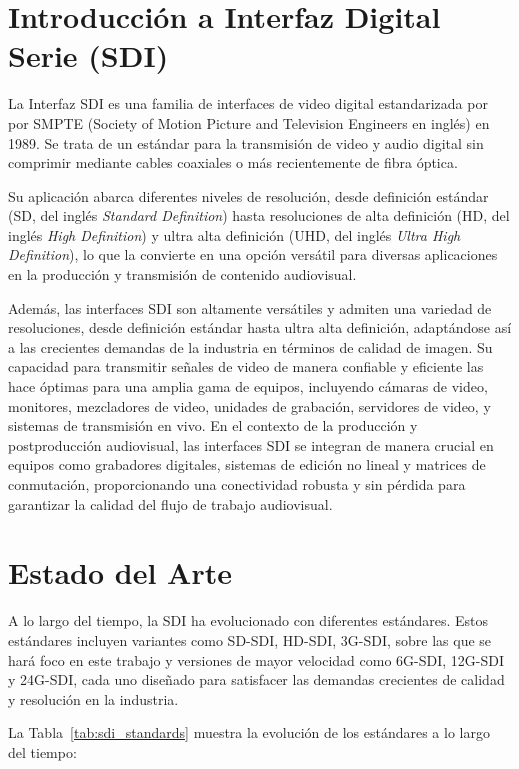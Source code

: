 \section{Introducción a Interfaz Digital Serie (SDI)}

La Interfaz SDI es una familia de interfaces de video digital estandarizada por
por SMPTE (Society of Motion Picture and Television Engineers en inglés) en
1989. Se trata de un estándar para la transmisión de video y audio digital sin
comprimir mediante cables coaxiales o más recientemente de fibra óptica.

Su aplicación abarca diferentes niveles de resolución, desde definición
estándar (SD, del inglés \textit{Standard Definition}) hasta resoluciones de
alta definición (HD, del inglés \textit{High Definition}) y ultra alta
definición (UHD, del inglés \textit{Ultra High Definition}), lo que la convierte
en una opción versátil para diversas aplicaciones en la producción y transmisión
de contenido audiovisual.

Además, las interfaces SDI son altamente versátiles y admiten una variedad de
resoluciones, desde definición estándar hasta ultra alta definición, adaptándose
así a las crecientes demandas de la industria en términos de calidad de imagen.
Su capacidad para transmitir señales de video de manera confiable y eficiente
las hace óptimas para una amplia gama de equipos, incluyendo cámaras de video,
monitores, mezcladores de video, unidades de grabación, servidores de video, y
sistemas de transmisión en vivo. En el contexto de la producción y
postproducción audiovisual, las interfaces SDI se integran de manera crucial en
equipos como grabadores digitales, sistemas de edición no lineal y matrices de
conmutación, proporcionando una conectividad robusta y sin pérdida para
garantizar la calidad del flujo de trabajo audiovisual.

\section{Estado del Arte}

A lo largo del tiempo, la SDI ha evolucionado con diferentes estándares. Estos
estándares incluyen variantes como SD-SDI, HD-SDI, 3G-SDI, sobre las que se
hará foco en este trabajo y versiones de mayor velocidad como 6G-SDI, 12G-SDI
y 24G-SDI, cada uno diseñado para satisfacer las demandas crecientes de calidad
y resolución en la industria.

La Tabla~\ref{tab:sdi_standards} muestra la evolución de los estándares a lo
largo del tiempo:

